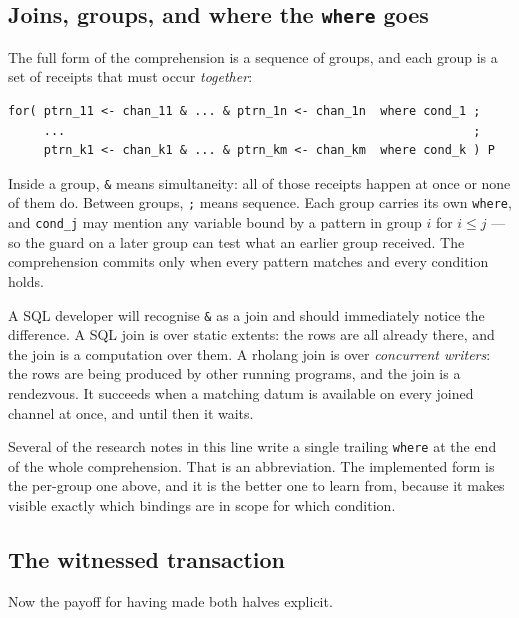 \subsection{Joins, groups, and where the \texttt{where} goes}

The full form of the comprehension is a sequence of groups, and each group is a
set of receipts that must occur \emph{together}:

\begin{lstlisting}
for( ptrn_11 <- chan_11 & ... & ptrn_1n <- chan_1n  where cond_1 ;
     ...                                                         ;
     ptrn_k1 <- chan_k1 & ... & ptrn_km <- chan_km  where cond_k ) P
\end{lstlisting}

Inside a group, \texttt{\&} means simultaneity: all of those receipts happen at
once or none of them do. Between groups, \texttt{;} means sequence. Each group
carries its own \texttt{where}, and \texttt{cond\_j} may mention any variable
bound by a pattern in group $i$ for $i \leq j$ --- so the guard on a later group
can test what an earlier group received. The comprehension commits only when
every pattern matches and every condition holds.

A SQL developer will recognise \texttt{\&} as a join and should immediately
notice the difference. A SQL join is over static extents: the rows are all
already there, and the join is a computation over them. A rholang join is over
\emph{concurrent writers}: the rows are being produced by other running
programs, and the join is a rendezvous. It succeeds when a matching datum is
available on every joined channel at once, and until then it waits.

\begin{aside}
Several of the research notes in this line write a single trailing
\texttt{where} at the end of the whole comprehension. That is an abbreviation.
The implemented form is the per-group one above, and it is the better one to
learn from, because it makes visible exactly which bindings are in scope for
which condition.
\end{aside}

\subsection{The witnessed transaction}
\label{sec:transaction}

Now the payoff for having made both halves explicit.

